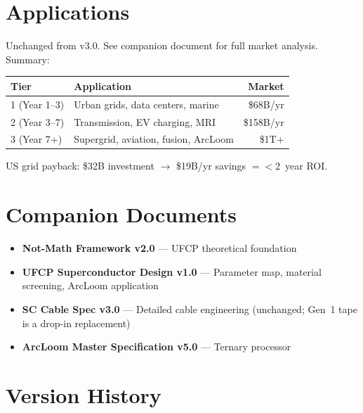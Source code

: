 \documentclass[11pt, a4paper]{article}
\begin{document}
\section{Applications}

Unchanged from v3.0. See companion document for full market
analysis. Summary:

\begin{center}
\begin{tabular}{@{}llr@{}}
\toprule
\textbf{Tier} & \textbf{Application} & \textbf{Market} \\
\midrule
1 (Year 1--3) & Urban grids, data centers, marine & \$68B/yr \\
2 (Year 3--7) & Transmission, EV charging, MRI & \$158B/yr \\
3 (Year 7+) & Supergrid, aviation, fusion, ArcLoom & \$1T+ \\
\bottomrule
\end{tabular}
\end{center}

US grid payback: \$32B investment $\to$ \$19B/yr savings $= < 2$~year ROI.

\section{Companion Documents}

\begin{itemize}[nosep]
  \item \textbf{Not-Math Framework v2.0} --- UFCP theoretical foundation
  \item \textbf{UFCP Superconductor Design v1.0} --- Parameter map,
        material screening, ArcLoom application
  \item \textbf{SC Cable Spec v3.0} --- Detailed cable engineering
        (unchanged; Gen~1 tape is a drop-in replacement)
  \item \textbf{ArcLoom Master Specification v5.0} --- Ternary processor
\end{itemize}

\section{Version History}
\end{document}
